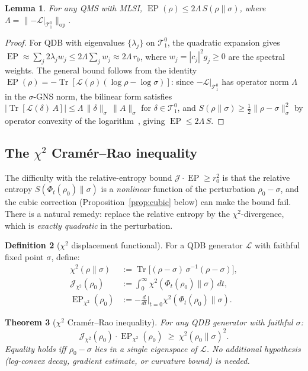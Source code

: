 \documentclass[11pt,a4paper]{article}
\newtheorem{theorem}{Theorem}[section]
\newtheorem{lemma}[theorem]{Lemma}
\theoremstyle{definition}
\newtheorem{definition}[theorem]{Definition}
\theoremstyle{remark}
\DeclareMathOperator{\Tr}{Tr}
\DeclareMathOperator{\EP}{EP}
\newcommand{\TT}{\mathcal{T}}
\newcommand{\LL}{\mathcal{L}}
\newcommand{\norm}[1]{\lVert #1 \rVert}
\newcommand{\ddt}{\tfrac{d}{dt}}
\newcommand{\Jchi}{\mathcal{J}_{\chi^2}}
\newcommand{\EPchi}{\EP_{\chi^2}}
\begin{document}
\begin{lemma}\label{lem:EP-bound}
For any QMS with MLSI, $\EP(\rho) \le 2\Lambda\,S(\rho\|\sigma)$,
where $\Lambda = \norm{-\LL|_{\TT_1^0}}_{\mathrm{op}}$.
\end{lemma}

\begin{proof}
For QDB with eigenvalues $\{\lambda_j\}$ on $\TT_1^0$,
the quadratic expansion gives $\EP \approx \sum_j 2\lambda_j w_j
\le 2\Lambda\sum_j w_j \approx 2\Lambda\,r_0$, where
$w_j = |c_j|^2 g_j \ge 0$ are the spectral weights.
The general bound follows from the identity
$\EP(\rho) = -\Tr[\LL(\rho)(\log\rho-\log\sigma)]$: since
$-\LL|_{\TT_1^0}$ has operator norm $\Lambda$ in the
$\sigma$-GNS norm, the bilinear form satisfies
$|\Tr[\LL(\delta)\,A]| \le
\Lambda\,\norm{\delta}_\sigma\,\norm{A}_\sigma$
for $\delta \in \TT_1^0$, and
$S(\rho\|\sigma) \ge \frac{1}{2}\norm{\rho-\sigma}_\sigma^2$
by operator convexity of the
logarithm~\cite{CarlenMaas2017}, giving
$\EP \le 2\Lambda\,S$.
\end{proof}

\subsection{The $\chi^2$ Cram\'er--Rao inequality}\label{ssec:chi2CR}

The difficulty with the relative-entropy bound
$\mathcal{J}\cdot\EP \ge r_0^2$ is that the relative entropy
$S(\Phi_t(\rho_0)\|\sigma)$ is a \emph{nonlinear} function of the
perturbation $\rho_0 - \sigma$, and the cubic correction
(Proposition~\ref{prop:cubic} below) can make the bound fail.
There is a natural remedy: replace the relative entropy by the
$\chi^2$-divergence, which is \emph{exactly quadratic} in the
perturbation.

\begin{definition}[$\chi^2$ displacement functional]\label{def:Jchi}
For a QDB generator $\LL$ with faithful fixed point $\sigma$,
define:
\begin{align*}
  \chi^2(\rho\|\sigma) &:=
  \Tr\bigl[(\rho-\sigma)\,\sigma^{-1}(\rho-\sigma)\bigr], \\
  \Jchi(\rho_0) &:=
  \int_0^\infty \chi^2(\Phi_t(\rho_0)\|\sigma)\,dt, \\
  \EPchi(\rho_0) &:=
  -\ddt\Big|_{t=0}\chi^2(\Phi_t(\rho_0)\|\sigma).
\end{align*}
\end{definition}

\begin{theorem}[$\chi^2$ Cram\'er--Rao inequality]\label{thm:chi2CR}
For any QDB generator with faithful $\sigma$:
\begin{equation}\label{eq:chi2CR}
  \boxed{\Jchi(\rho_0)\cdot\EPchi(\rho_0) \;\ge\;
  \chi^2(\rho_0\|\sigma)^2.}
\end{equation}
Equality holds iff $\rho_0 - \sigma$ lies in a single eigenspace
of $\LL$.  No additional hypothesis (log-convex decay, gradient
estimate, or curvature bound) is needed.
\end{theorem}
\end{document}

